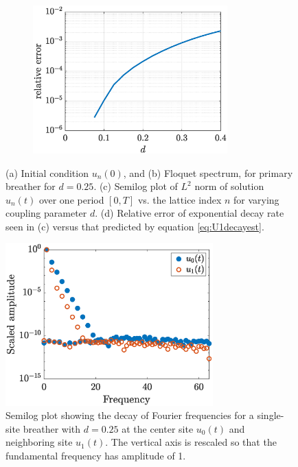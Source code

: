 \documentclass[12pt,reqno]{amsart}
\theoremstyle{definition}
\begin{document}
\begin{figure}
\begin{center}
\begin{subfigure}{0.45\linewidth}
		\caption{}
		\includegraphics[width=7.5cm]{singledecayerror.eps}
		\label{fig:singled}
	\end{subfigure}
	\end{center}
	\caption{(a) Initial condition $u_n(0)$, and (b) Floquet spectrum, for primary breather for $d = 0.25$. (c) Semilog plot of $L^2$ norm of solution $u_n(t)$ over one period $[0,T]$ vs. the lattice index $n$ for varying coupling parameter $d$. (d) Relative error of exponential decay rate seen in (c) versus that predicted by equation \cref{eq:U1decayest}. }
	\label{fig:single}
\end{figure}

\begin{figure}
	\begin{center}
	\includegraphics[width=8cm]{freqdecay.eps} 
	\end{center}
	\caption{Semilog plot showing the decay of Fourier frequencies for a single-site breather with $d=0.25$ at the center site $u_0(t)$ and neighboring site $u_1(t)$. The vertical axis is rescaled so that the fundamental frequency has amplitude of 1.}
	\label{fig:freqdecay}
\end{figure}
\end{document}
